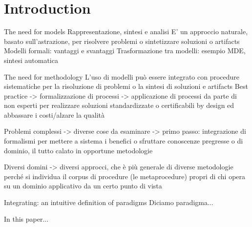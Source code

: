 \section{Introduction}
\label{intro}
The need for models
Rappresentazione, sintesi e analisi
E' un approccio naturale, basato sull'astrazione, per risolvere problemi o sintetizzare soluzioni o artifacts
Modelli formali: vantaggi e svantaggi
Trasformazione tra modelli: esempio MDE, sintesi automatica

The need for methodology
L'uso di modelli può essere integrato con procedure sistematiche per la risoluzione di problemi o la sintesi di soluzioni e artifacts
Best practice -> formalizzazione di processi -> applicazione di processi da parte di non esperti per realizzare soluzioni standardizzate o certificabili by design ed abbassare i costi/alzare la qualità

Problemi complessi -> diverse cose da esaminare -> primo passo: integrazione di formalismi per mettere a sistema i benefici o sfruttare conoscenze pregresse o di dominio, il tutto calato in opportune metodologie

Diversi domini -> diversi approcci, che è più generale di diverse metodologie perché si individua il corpus di procedure (le metaprocedure) propri di chi opera su un dominio applicativo da un certo punto di vista

Integrating: an intuitive definition of paradigms
Diciamo paradigma...

In this paper...